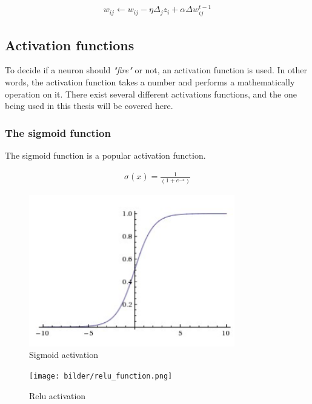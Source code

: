 \documentclass[USenglish]{ifimaster}  %
\begin{document}
\begin{equation}\label{eq:momentum}
\begin{aligned}
w_{ij} \longleftarrow w_{ij} - \eta\Delta_j z_i+\alpha\Delta w^{t-1}_{ij}
\end{aligned}
\end{equation}

\subsection{Activation functions}
To decide if a neuron should \textit{"fire"} or not, an activation function is used. In other words, the activation function takes a number and performs a mathematically operation on it. There exist several different activations functions, and the one being used in this thesis will be covered here.
\subsubsection{The sigmoid function}
The sigmoid function is a popular activation function.

\begin{equation}\label{eq:sigmoid}
\begin{aligned}
\sigma(x) = \frac{1}{(1 + e^{-x})}
\end{aligned}
\end{equation}

\begin{figure}[ht]
    \centering
    \includegraphics[width=0.8\textwidth]{bilder/sigmoid_function.png}
    \caption{Sigmoid activation \cite{website:cs231n_activation_functions}}
    \label{fig:sigmoid}
\end{figure}

\begin{figure}[ht]
    \centering
    \texttt{[image: bilder/relu\_function.png]}
    \caption{Relu activation \cite{website:cs231n_activation_functions}}
    \label{fig:relu}
\end{figure}
\end{document}
